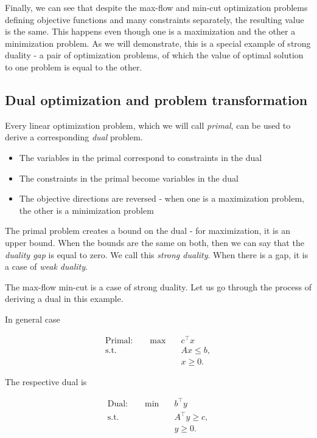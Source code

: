 \documentclass[12pt, openany]{article}
\begin{document}
Finally, we can see that despite the max-flow and min-cut optimization problems defining objective functions and many constraints separately, the resulting value is the same. This happens even though one is a maximization and the other a minimization problem. As we will demonstrate, this is a special example of strong duality - a pair of optimization problems, of which the value of optimal solution to one problem is equal to the other.

\subsection{Dual optimization and problem transformation}

Every linear optimization problem, which we will call \textit{primal}, can be used to derive a corresponding \textit{dual} problem. 
\begin{itemize}
    \item The variables in the primal correspond to constraints in the dual
    \item The constraints in the primal become variables in the dual
    \item The objective directions are reversed - when one is a maximization problem, the other is a minimization problem
\end{itemize}

The primal problem creates a bound on the dual - for maximization, it is an upper bound. When the bounds are the same on both, then we can say that the \textit{duality gap} is equal to zero. We call this \textit{strong duality}. When there is a gap, it is a case of \textit{weak duality}.

The max-flow min-cut is a case of strong duality. Let us go through the process of deriving a dual in this example.

In general case

\[
\begin{aligned}
\text{Primal:} \qquad
\max \quad & c^\top x \\
\text{s.t.} \quad & Ax \le b, \\
& x \ge 0 .
\end{aligned}
\]

The respective dual is

\[
\begin{aligned}
\text{Dual:} \qquad
\min \quad & b^\top y \\
\text{s.t.} \quad & A^\top y \ge c, \\
& y \ge 0 .
\end{aligned}
\]
\end{document}
